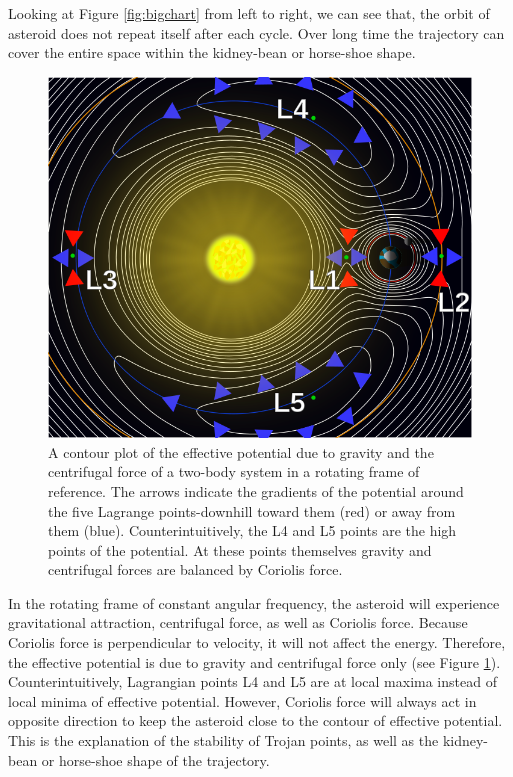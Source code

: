 \documentclass[12pt,a4paper]{article}
\begin{document}
Looking at Figure \ref{fig:bigchart} from left to right, we can see that, the orbit of asteroid does not repeat itself after each cycle. Over long time the trajectory can cover the entire space within the kidney-bean or horse-shoe shape.


\begin{figure}[H]
\centering
\includegraphics[width=5in]{704px-Lagrange_points2.png}
\caption{A contour plot of the effective potential due to gravity and the centrifugal force of a two-body system in a rotating frame of reference. The arrows indicate the gradients of the potential around the five Lagrange points-downhill toward them (red) or away from them (blue). Counterintuitively, the L4 and L5 points are the high points of the potential. At these points themselves gravity and centrifugal forces are balanced by Coriolis force.}
\label{fig:potential}
\end{figure}

In the rotating frame of constant angular frequency, the asteroid will experience gravitational attraction, centrifugal force, as well as Coriolis force. Because Coriolis force is perpendicular to velocity, it will not affect the energy. Therefore, the effective potential is due to gravity and centrifugal force only (see Figure \ref{fig:potential}). Counterintuitively, Lagrangian points L4 and L5 are at local maxima instead of local minima of effective potential. However, Coriolis force will always act in opposite direction to keep the asteroid close to the contour of effective potential. This is the explanation of the stability of Trojan points, as well as the kidney-bean or horse-shoe shape of the trajectory.
\end{document}
